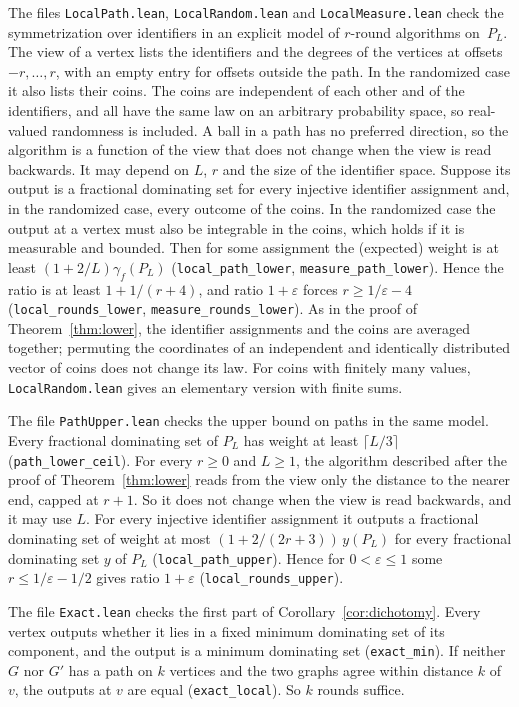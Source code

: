 \documentclass[11pt]{article}
\theoremstyle{remark}
\begin{document}
The files \texttt{LocalPath.lean}, \texttt{LocalRandom.lean} and \texttt{LocalMeasure.lean} check the
symmetrization over identifiers in an explicit model of $r$-round algorithms on~$P_L$. The view of a
vertex lists the identifiers and the degrees of the vertices at offsets $-r,\dots,r$, with an empty
entry for offsets outside the path. In the randomized case it also lists their coins. The coins are
independent of each other and of the identifiers, and all have the same law on an arbitrary
probability space, so real-valued randomness is included. A ball in a path has no
preferred direction, so the algorithm is a function of the view that does not change when the view
is read backwards. It may depend on $L$, $r$ and the size of the identifier space. Suppose its
output is a fractional dominating set for every injective identifier assignment and, in the
randomized case, every outcome of the coins. In the randomized case the output at a vertex must
also be integrable in the coins, which holds if it is measurable and bounded. Then for some
assignment the (expected) weight is at least $(1+2/L)\gamma_f(P_L)$ (\texttt{local\_path\_lower},
\texttt{measure\_path\_lower}). Hence the ratio is at least $1+1/(r+4)$, and ratio $1+\varepsilon$
forces $r\ge1/\varepsilon-4$ (\texttt{local\_rounds\_lower}, \texttt{measure\_rounds\_lower}). As in
the proof of Theorem~\ref{thm:lower}, the identifier assignments and the coins are averaged
together; permuting the coordinates of an independent and identically distributed vector of coins
does not change its law. For coins with finitely many values, \texttt{LocalRandom.lean} gives an
elementary version with finite sums.

The file \texttt{PathUpper.lean} checks the upper bound on paths in the same model. Every
fractional dominating set of $P_L$ has weight at least $\lceil L/3\rceil$
(\texttt{path\_lower\_ceil}). For every $r\ge0$ and $L\ge1$, the algorithm described after the
proof of Theorem~\ref{thm:lower} reads from the view only the distance to the nearer end, capped
at $r+1$. So it does not change when the view is read backwards, and it may use $L$. For every
injective identifier assignment it outputs a fractional dominating set of weight at most
$(1+2/(2r+3))\,y(P_L)$ for every fractional dominating set $y$ of $P_L$
(\texttt{local\_path\_upper}). Hence for $0<\varepsilon\le1$ some $r\le1/\varepsilon-1/2$
gives ratio $1+\varepsilon$ (\texttt{local\_rounds\_upper}).

The file \texttt{Exact.lean} checks the first part of Corollary~\ref{cor:dichotomy}. Every vertex
outputs whether it lies in a fixed minimum dominating set of its component, and the output is a
minimum dominating set (\texttt{exact\_min}). If neither $G$ nor $G'$ has a path on $k$ vertices and
the two graphs agree within distance $k$ of~$v$, the outputs at $v$ are equal
(\texttt{exact\_local}). So $k$ rounds suffice.
\end{document}
